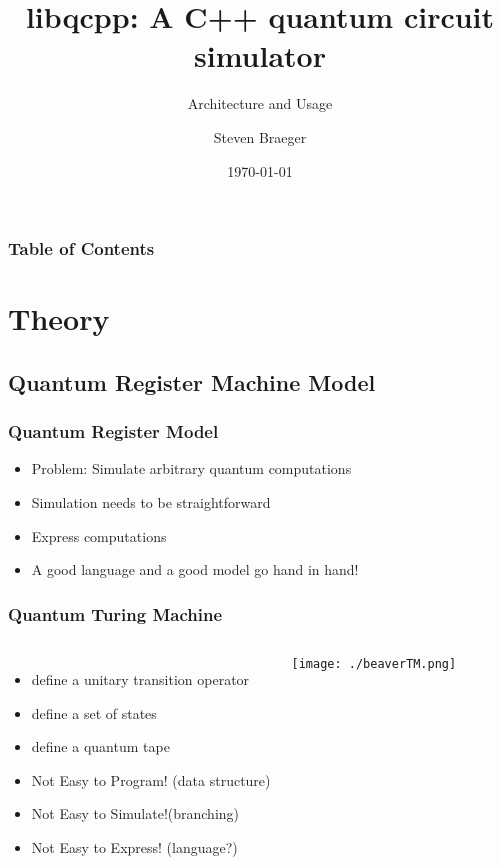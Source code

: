 \documentclass{beamer}
\title
{libqcpp: A C++ quantum circuit simulator}
\subtitle{Architecture and Usage}
\author
{Steven Braeger}
\date{\today}
\begin{document}
\frame{\titlepage} 


\begin{frame}
\frametitle{Table of Contents}
\tableofcontents
\end{frame}

\section{Theory}
\subsection{Quantum Register Machine Model}

\begin{frame}
  \frametitle{Quantum Register Model}
   \begin{itemize}
    \item Problem:  Simulate arbitrary quantum computations
    \item Simulation needs to be straightforward
    \item Express computations
    \item A good language and a good model go hand in hand!
   \end{itemize}
\end{frame}

\begin{frame}
   \frametitle{Quantum Turing Machine}

\begin{columns}[c]
\column{2.5in}
   \begin{itemize}
    \item define a unitary transition operator
    \item define a set of states
    \item define a quantum tape
    \item Not Easy to Program! (data structure)
    \item Not Easy to Simulate!(branching)
    \item Not Easy to Express! (language?)
   \end{itemize}
\column{2in}
\texttt{[image: ./beaverTM.png]}
\end{columns}

\end{frame}
\end{document}
